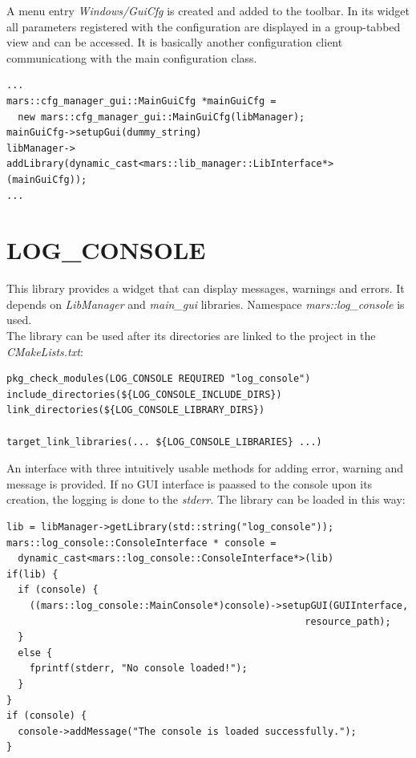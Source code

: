 \documentclass{article}
\begin{document}
A menu entry \emph{Windows/GuiCfg} is created and added to the toolbar. In its widget all parameters 
registered with the configuration are displayed in a group-tabbed view and can be accessed. It is basically
another configuration client communicationg with the main configuration class. 

\begin{lstlisting}
...
mars::cfg_manager_gui::MainGuiCfg *mainGuiCfg = 
  new mars::cfg_manager_gui::MainGuiCfg(libManager);
mainGuiCfg->setupGui(dummy_string)
libManager->
addLibrary(dynamic_cast<mars::lib_manager::LibInterface*>(mainGuiCfg));
...
\end{lstlisting}



\section{LOG\_CONSOLE}

This library provides a widget that can display messages, warnings and errors. It depends on \emph{LibManager}
and \emph{main\_gui} libraries. Namespace \emph{mars::log\_console} is used.\\

The library can be used after its directories are linked to the project in the \emph{CMakeLists.txt}:

\begin{lstlisting}
pkg_check_modules(LOG_CONSOLE REQUIRED "log_console")
include_directories(${LOG_CONSOLE_INCLUDE_DIRS})
link_directories(${LOG_CONSOLE_LIBRARY_DIRS})

target_link_libraries(... ${LOG_CONSOLE_LIBRARIES} ...)
\end{lstlisting}

An interface with three intuitively usable methods for adding error, warning and message is provided. If no 
GUI interface is paassed to the console upon its creation, the logging is done to the \emph{stderr}.
The library can be loaded in this way:

\begin{lstlisting}
lib = libManager->getLibrary(std::string("log_console"));
mars::log_console::ConsoleInterface * console =
  dynamic_cast<mars::log_console::ConsoleInterface*>(lib)
if(lib) {
  if (console) {
    ((mars::log_console::MainConsole*)console)->setupGUI(GUIInterface,
                                                    resource_path);
  }
  else {
    fprintf(stderr, "No console loaded!");
  }
}
if (console) {
  console->addMessage("The console is loaded successfully.");
}
\end{lstlisting}
\end{document}
